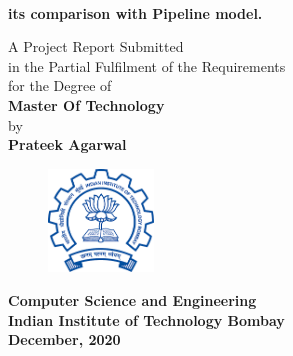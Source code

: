 \titlepage
\begin{center}
\\
 {\bf{\Large{its comparison with Pipeline model.}}}\\
\end{center}
\vspace{25mm}
\begin{center}
A Project Report Submitted\\
in the Partial Fulfilment of the Requirements
\\
for the Degree of
\\
\vspace{30mm}
{\bf {\large Master Of Technology}}
\\
by
\\
{\bf{\Large Prateek Agarwal}}\\
\end{center}
\vspace{20mm}
\begin{figure}[h]
\centering
\includegraphics[width=0.25\textwidth]{./fig/iitblogo.png}

\end{figure}
\begin{center}
\vspace{3mm}
{\bf {\large {Computer Science and Engineering}}}\\
\vspace{2mm}
{\bf {\large {Indian Institute of Technology Bombay}}}\\
\vspace{3mm}
{\textbf{ December, 2020}}\\
\end{center}

